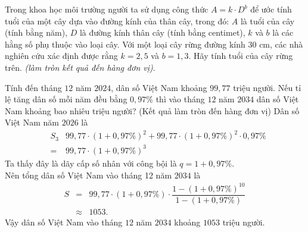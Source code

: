 \begin{bt}%
	Trong khoa học môi trường người ta sử dụng công thức $A=k\cdot D^b$ để ước tính tuổi của một cây dựa vào đường kính của thân cây, trong đó: $A$ là tuổi của cây (tính bằng năm), $D$ là đường kính thân cây (tính bằng centimet), $k$ và $b$ là các hằng số phụ thuộc vào loại cây. Với một loại cây rừng đường kính $30$ cm, các nhà nghiên cứu xác định được rằng $k=2{,}5$ và $b=1{,}3$. Hãy tính tuổi của cây rừng trên. {\it (làm tròn kết quả đến hàng đơn vị)}.
\end{bt}

\begin{bt}%
	Tính đến tháng $12$ năm $2024$, dân số Việt Nam khoảng $99{,}77$ triệu người. Nếu tỉ lệ tăng dân số mỗi năm đều bằng $0{,}97\%$ thì vào tháng $12$ năm $2034$ dân số Việt Nam khoảng bao nhiêu triệu người? (Kết quả làm tròn đến hàng đơn vị)
	Dân số Việt Nam năm $2026$ là \allowdisplaybreaks
	\begin{eqnarray*}
		&S_3&99{,}77\cdot\left(1+0{,}97\%\right)^2+99{,}77\cdot\left(1+0{,}97\%\right)^2\cdot 0{,}97\%\\
		&=&99{,}77\cdot\left(1+0{,}97\%\right)^3
	\end{eqnarray*}
	Ta thấy đây là dãy cấp số nhân với công bội là $q=1+0{,}97\%$.\\
	Nên tổng dân số Việt Nam vào tháng 12 năm $2034$ là \allowdisplaybreaks
	\begin{eqnarray*}
		S&=&99{,}77\cdot\left(1+0{,}97\%\right)\cdot\dfrac{1-\left(1+0{,}97\%\right)^{10}}{1-\left(1+0{,}97\%\right)}\\
		&\approx& 1053.
	\end{eqnarray*}
	Vậy dân số Việt Nam vào tháng $12$ năm $2034$ khoảng $1053$ triệu người.
\end{bt}

